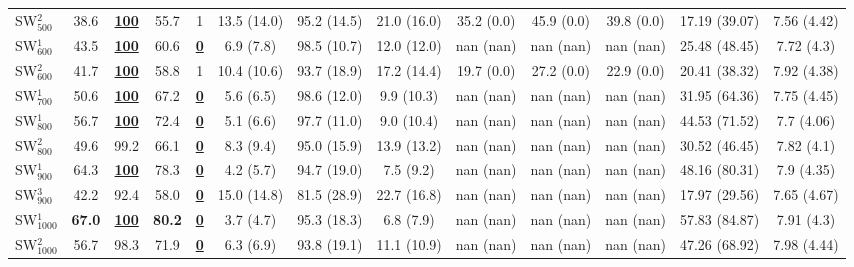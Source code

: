 \documentclass[a4paper,authoryear,review]{elsarticle}
\begin{document}
\begin{table}[]
\begin{adjustbox}{angle=90}
{\begin{tabular}{lcccccccccccc}
                SW$_{500}^{2}$ & 38.6 & {\ul \textbf{100}} & 55.7 & 1 & 13.5 (14.0) & 95.2 (14.5) & 21.0 (16.0) & 35.2 (0.0) & 45.9 (0.0) & 39.8 (0.0) & 17.19 (39.07) & 7.56 (4.42) \\
                SW$_{600}^{1}$ & 43.5 & {\ul \textbf{100}} & 60.6 & {\ul \textbf{0}} & 6.9 (7.8) & 98.5 (10.7) & 12.0 (12.0) & nan (nan) & nan (nan) & nan (nan) & 25.48 (48.45) & 7.72 (4.3) \\
                SW$_{600}^{2}$ & 41.7 & {\ul \textbf{100}} & 58.8 & 1 & 10.4 (10.6) & 93.7 (18.9) & 17.2 (14.4) & 19.7 (0.0) & 27.2 (0.0) & 22.9 (0.0) & 20.41 (38.32) & 7.92 (4.38) \\
                SW$_{700}^{1}$ & 50.6 & {\ul \textbf{100}} & 67.2 & {\ul \textbf{0}} & 5.6 (6.5) & 98.6 (12.0) & 9.9 (10.3) & nan (nan) & nan (nan) & nan (nan) & 31.95 (64.36) & 7.75 (4.45) \\
                SW$_{800}^{1}$ & 56.7 & {\ul \textbf{100}} & 72.4 & {\ul \textbf{0}} & 5.1 (6.6) & 97.7 (11.0) & 9.0 (10.4) & nan (nan) & nan (nan) & nan (nan) & 44.53 (71.52) & 7.7 (4.06) \\
                SW$_{800}^{2}$ & 49.6 & 99.2 & 66.1 & {\ul \textbf{0}} & 8.3 (9.4) & 95.0 (15.9) & 13.9 (13.2) & nan (nan) & nan (nan) & nan (nan) & 30.52 (46.45) & 7.82 (4.1) \\
                SW$_{900}^{1}$ & 64.3 & {\ul \textbf{100}} & 78.3 & {\ul \textbf{0}} & 4.2 (5.7) & 94.7 (19.0) & 7.5 (9.2) & nan (nan) & nan (nan) & nan (nan) & 48.16 (80.31) & 7.9 (4.35) \\
                SW$_{900}^{3}$ & 42.2 & 92.4 & 58.0 & {\ul \textbf{0}} & 15.0 (14.8) & 81.5 (28.9) & 22.7 (16.8) & nan (nan) & nan (nan) & nan (nan) & 17.97 (29.56) & 7.65 (4.67) \\
                SW$_{1000}^{1}$ & \textbf{67.0} & {\ul \textbf{100}} & \textbf{80.2} & {\ul \textbf{0}} & 3.7 (4.7) & 95.3 (18.3) & 6.8 (7.9) & nan (nan) & nan (nan) & nan (nan) & 57.83 (84.87) & 7.91 (4.3) \\
                SW$_{1000}^{2}$ & 56.7 & 98.3 & 71.9 & {\ul \textbf{0}} & 6.3 (6.9) & 93.8 (19.1) & 11.1 (10.9) & nan (nan) & nan (nan) & nan (nan) & 47.26 (68.92) & 7.98 (4.44) \\ \hline
            \end{tabular}     
        }
    \end{adjustbox}

\end{table}
\end{document}
